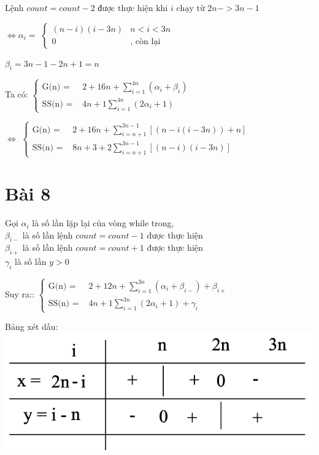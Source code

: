 \documentclass{article}
\newcommand\tab[1][1cm]{\hspace*{#1}}
\begin{document}
\(\text{Lệnh } count = count - 2 \text{ được thực hiện khi } i \text{ chạy từ } 2n -> 3n -1\)

\tab $\Leftrightarrow \alpha_{i} = $
\(
\begin{cases}
    (n-i)(i-3n) & n < i < 3n \\
    0 & \text{, còn lại}
\end{cases}
\)
\vspace{10mm}

\tab \(\beta_{i} = 3n -1-2n+1 = n\)
\vspace{20mm}

\tab Ta có:
\(
\begin{cases}
    \text{G(n) = } & 2 + 16n +  \sum\limits_{i=1}^{4n}(\alpha_{i} + \beta_{i}) \\
    \text{SS(n) = } &  4n + 1  \sum\limits_{i=1}^{4n}(2\alpha_{i}+1)
\end{cases}
\)
\vspace{20mm}

\tab $\Leftrightarrow $
\(
\begin{cases}
    \text{G(n) = } & 2 + 16n +  \sum\limits_{i=n+1}^{3n-1}[(n-i(i-3n)) + n] \\
    \text{SS(n) = } &  8n + 3 + 2\sum\limits_{i=n+1}^{3n-1}[(n-i)(i-3n)]
\end{cases}
\)
\vspace{20mm}

\section*{Bài 8}
Gọi $\alpha_{i}$ là số lần lặp lại của vòng while trong,\\
\tab $\beta_{i-}$ là số lần lệnh $count = count - 1$ được thực hiện\\
\tab $ \beta_{i+}$ là số lần lệnh $count = count + 1$ được thực hiện\\
\tab $\gamma_{\acute{i}}$ là số lần $ y > 0$

\vspace{15mm}
\tab Suy ra::
\(
\begin{cases}
    \text{G(n) = } & 2 + 12n +  \sum\limits_{i=1}^{3n}(\alpha_{i} + \beta_{i-}) +  \beta_{i+}\\
    \text{SS(n) = } &  4n + 1  \sum\limits_{i=1}^{3n}(2\alpha_{i}+1) + \gamma_{\acute{i}}
\end{cases}
\)

\vspace{15mm}
Bảng xét dấu:\\
\includegraphics[scale=0.7]{BT/bangbai8}
\end{document}
